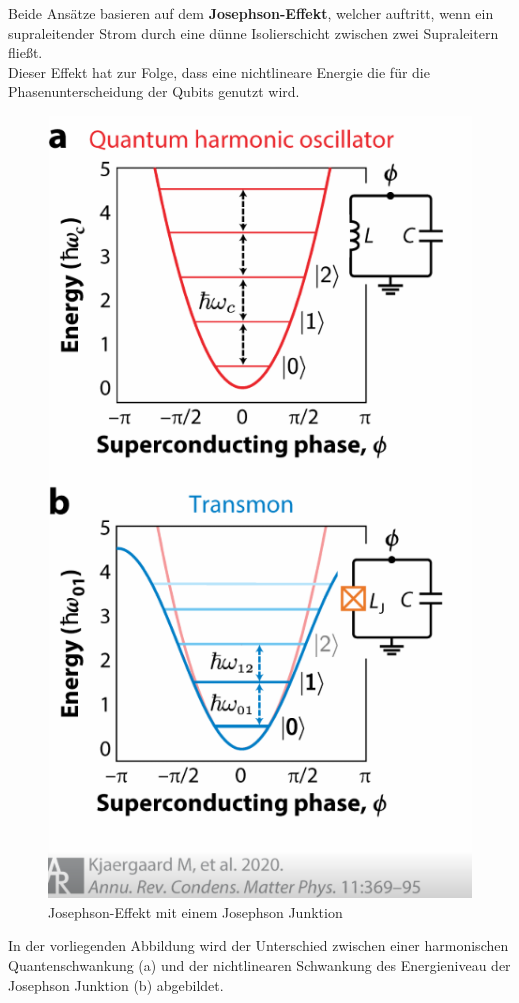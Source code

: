 Beide Ansätze basieren auf dem \textbf{Josephson-Effekt}, welcher auftritt, wenn ein supraleitender Strom durch eine dünne Isolierschicht zwischen zwei Supraleitern fließt.\\
Dieser Effekt hat zur Folge, dass eine nichtlineare Energie die für die Phasenunterscheidung der Qubits genutzt wird.\\

\begin{figure}[H]
    \centering
    \includegraphics[width=0.75\linewidth]{img/JJ.png}
    \caption{Josephson-Effekt mit einem Josephson Junktion}
    \label{fig:Josephson-junktion}
\end{figure}

In der vorliegenden Abbildung wird der Unterschied zwischen einer harmonischen Quantenschwankung (a) und der nichtlinearen Schwankung des Energieniveau der Josephson Junktion (b) abgebildet.\\


